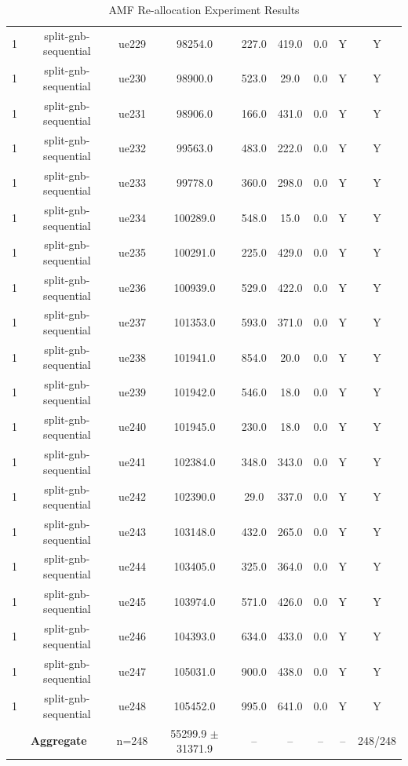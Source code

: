 \begin{table}[ht]
\begin{tabular}{|c|c|c|c|c|c|c|c|c|}
1 & split-gnb-sequential & ue229 & 98254.0 & 227.0 & 419.0 & 0.0 & Y & Y \\
1 & split-gnb-sequential & ue230 & 98900.0 & 523.0 & 29.0 & 0.0 & Y & Y \\
1 & split-gnb-sequential & ue231 & 98906.0 & 166.0 & 431.0 & 0.0 & Y & Y \\
1 & split-gnb-sequential & ue232 & 99563.0 & 483.0 & 222.0 & 0.0 & Y & Y \\
1 & split-gnb-sequential & ue233 & 99778.0 & 360.0 & 298.0 & 0.0 & Y & Y \\
1 & split-gnb-sequential & ue234 & 100289.0 & 548.0 & 15.0 & 0.0 & Y & Y \\
1 & split-gnb-sequential & ue235 & 100291.0 & 225.0 & 429.0 & 0.0 & Y & Y \\
1 & split-gnb-sequential & ue236 & 100939.0 & 529.0 & 422.0 & 0.0 & Y & Y \\
1 & split-gnb-sequential & ue237 & 101353.0 & 593.0 & 371.0 & 0.0 & Y & Y \\
1 & split-gnb-sequential & ue238 & 101941.0 & 854.0 & 20.0 & 0.0 & Y & Y \\
1 & split-gnb-sequential & ue239 & 101942.0 & 546.0 & 18.0 & 0.0 & Y & Y \\
1 & split-gnb-sequential & ue240 & 101945.0 & 230.0 & 18.0 & 0.0 & Y & Y \\
1 & split-gnb-sequential & ue241 & 102384.0 & 348.0 & 343.0 & 0.0 & Y & Y \\
1 & split-gnb-sequential & ue242 & 102390.0 & 29.0 & 337.0 & 0.0 & Y & Y \\
1 & split-gnb-sequential & ue243 & 103148.0 & 432.0 & 265.0 & 0.0 & Y & Y \\
1 & split-gnb-sequential & ue244 & 103405.0 & 325.0 & 364.0 & 0.0 & Y & Y \\
1 & split-gnb-sequential & ue245 & 103974.0 & 571.0 & 426.0 & 0.0 & Y & Y \\
1 & split-gnb-sequential & ue246 & 104393.0 & 634.0 & 433.0 & 0.0 & Y & Y \\
1 & split-gnb-sequential & ue247 & 105031.0 & 900.0 & 438.0 & 0.0 & Y & Y \\
1 & split-gnb-sequential & ue248 & 105452.0 & 995.0 & 641.0 & 0.0 & Y & Y \\
\multicolumn{2}{|c|}{\textbf{Aggregate}} & n=248 & 55299.9 $\pm$ 31371.9 & -- & -- & -- & -- & 248/248 \\
\hline
\end{tabular}
\caption{AMF Re-allocation Experiment Results}
\label{tab:amf_realloc}
\end{table}
